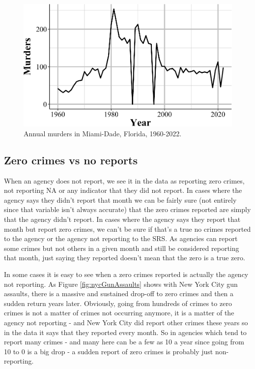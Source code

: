\documentclass[
  12pt,
  openany]{book}
\begin{document}
\begin{figure}

{\centering \includegraphics[width=0.9\linewidth]{index_files/figure-latex/miamiDadeMurderAnnual-1} 

}

\caption{Annual murders in Miami-Dade, Florida, 1960-2022.}\label{fig:miamiDadeMurderAnnual}
\end{figure}

\subsection{Zero crimes vs no reports}\label{zero-crimes-vs-no-reports}

When an agency does not report, we see it in the data as reporting zero crimes, not reporting NA or any indicator that they did not report. In cases where the agency says they didn't report that month we can be fairly sure (not entirely since that variable isn't always accurate) that the zero crimes reported are simply that the agency didn't report. In cases where the agency says they report that month but report zero crimes, we can't be sure if that's a true no crimes reported to the agency or the agency not reporting to the SRS. As agencies can report some crimes but not others in a given month and still be considered reporting that month, just saying they reported doesn't mean that the zero is a true zero.

In some cases it is easy to see when a zero crimes reported is actually the agency not reporting. As Figure \ref{fig:nycGunAssaults} shows with New York City gun assaults, there is a massive and sustained drop-off to zero crimes and then a sudden return years later. Obviously, going from hundreds of crimes to zero crimes is not a matter of crimes not occurring anymore, it is a matter of the agency not reporting - and New York City did report other crimes these years so in the data it says that they reported every month. So in agencies which tend to report many crimes - and many here can be a few as 10 a year since going from 10 to 0 is a big drop - a sudden report of zero crimes is probably just non-reporting.
\end{document}

